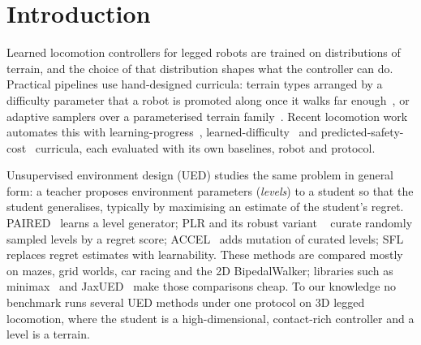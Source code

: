 \section{Introduction}
\label{sec:intro}

Learned locomotion controllers for legged robots are trained on
distributions of terrain, and the choice of that distribution shapes what
the controller can do. Practical pipelines use hand-designed
curricula: terrain types arranged by a difficulty parameter that a robot is
promoted along once it walks far enough~\citep{rudin2022learning}, or
adaptive samplers over a parameterised terrain
family~\citep{lee2020learning}. Recent locomotion work automates this with
learning-progress~\citep{li2026lpacrl}, learned-difficulty~\citep{liu2026tacl}
and predicted-safety-cost~\citep{ovinnikov2026psc} curricula, each evaluated
with its own baselines, robot and protocol.

Unsupervised environment design (UED) studies the same problem in general
form: a teacher proposes environment parameters (\emph{levels}) to a student
so that the student generalises, typically by maximising an estimate of the
student's regret. PAIRED~\citep{dennis2020paired} learns a level generator;
PLR and its robust variant \plr~\citep{jiang2021plr,jiang2021replay} curate
randomly sampled levels by a regret score; ACCEL~\citep{parkerholder2022accel}
adds mutation of curated levels; SFL~\citep{rutherford2024noregrets} replaces
regret estimates with learnability. These methods are compared mostly on
mazes, grid worlds, car racing and the 2D BipedalWalker; libraries such as
minimax~\citep{jiang2023minimax} and JaxUED~\citep{coward2024jaxued} make
those comparisons cheap. To our knowledge no benchmark runs several UED
methods under one protocol on 3D legged locomotion, where the student is a
high-dimensional, contact-rich controller and a level is a terrain.


